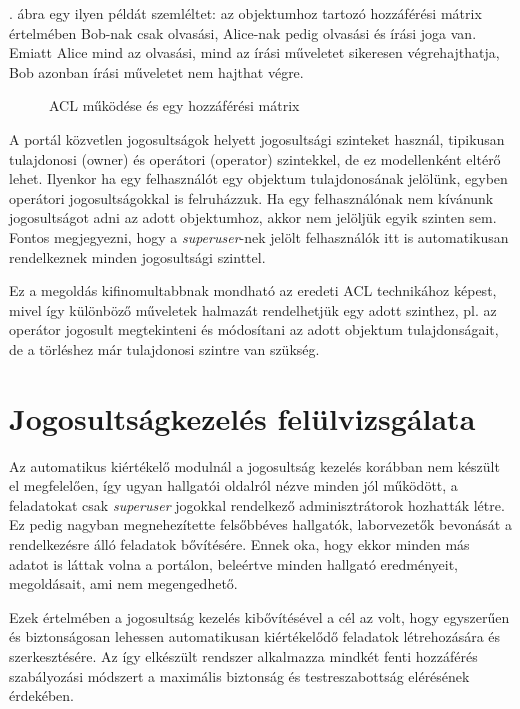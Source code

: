 . ábra egy ilyen példát szemléltet: az objektumhoz tartozó hozzáférési mátrix értelmében Bob-nak csak olvasási, Alice-nak pedig olvasási és írási joga van. Emiatt Alice mind az olvasási, mind az írási műveletet sikeresen végrehajthatja, Bob azonban írási műveletet nem hajthat végre.

\begin{figure}[h]
    \centering
    \caption{ACL működése és egy hozzáférési mátrix}
    \label{fig:acl}
\end{figure}

A portál közvetlen jogosultságok helyett jogosultsági szinteket használ, tipikusan tulajdonosi (owner) és operátori (operator) szintekkel, de ez modellenként eltérő lehet. Ilyenkor ha egy felhasználót egy objektum tulajdonosának jelölünk, egyben operátori jogosultságokkal is felruházzuk. Ha egy felhasználónak nem kívánunk jogosultságot adni az adott objektumhoz, akkor nem jelöljük egyik szinten sem. Fontos megjegyezni, hogy a \textit{superuser}-nek jelölt felhasználók itt is automatikusan rendelkeznek minden jogosultsági szinttel.

Ez a megoldás kifinomultabbnak mondható az eredeti ACL technikához képest, mivel így különböző műveletek halmazát rendelhetjük egy adott szinthez, pl. az operátor jogosult megtekinteni és módosítani az adott objektum tulajdonságait, de a törléshez már tulajdonosi szintre van szükség.

\section{Jogosultságkezelés felülvizsgálata}

Az automatikus kiértékelő modulnál a jogosultság kezelés korábban nem készült el megfelelően, így ugyan hallgatói oldalról nézve minden jól működött, a feladatokat csak \textit{superuser} jogokkal rendelkező adminisztrátorok hozhatták létre. Ez pedig nagyban megnehezítette felsőbbéves hallgatók, laborvezetők bevonását a rendelkezésre álló feladatok bővítésére. Ennek oka, hogy ekkor minden más adatot is láttak volna a portálon, beleértve minden hallgató eredményeit, megoldásait, ami nem megengedhető.

Ezek értelmében a jogosultság kezelés kibővítésével a cél az volt, hogy egyszerűen és biztonságosan lehessen automatikusan kiértékelődő feladatok létrehozására és szerkesztésére. Az így elkészült rendszer alkalmazza mindkét fenti hozzáférés szabályozási módszert a maximális biztonság és testreszabottság elérésének érdekében.

